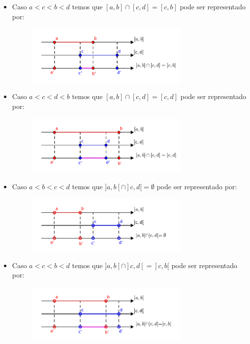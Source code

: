 \begin{itemize}
 \item Caso $a< c< b< d$ temos que $[a, b] \cap [c, d]= [c, b]$ pode ser representado por:
  \begin{figure}[H]
 \centering
 \includegraphics[width=8cm]{Capitulos/Figuras/intersecaoacbd.pdf}
 \end{figure}

  \item Caso $a< c< d< b$ temos que $[a, b] \cap [c, d]= [c, d]$ pode ser representado por:
  \begin{figure}[H]
 \centering
 \includegraphics[width=8cm]{Capitulos/Figuras/intersecaoacdb.pdf}
 \end{figure}

 \item Caso $a< b< c< d$ temos que $]a, b[ \cap ]c, d[ = \emptyset$ pode ser representado por:
  \begin{figure}[H]
 \centering
 \includegraphics[width=8cm]{Capitulos/Figuras/intersecao-a-b-c-d.pdf}
 \end{figure}

 \item Caso $a< c< b< d$ temos que $]a, b[ \cap ]c, d[= ]c, b[$ pode ser representado por:
  \begin{figure}[H]
 \centering
 \includegraphics[width=8cm]{Capitulos/Figuras/intersecaoa-c-bd.pdf}
 \end{figure}


\end{itemize}
